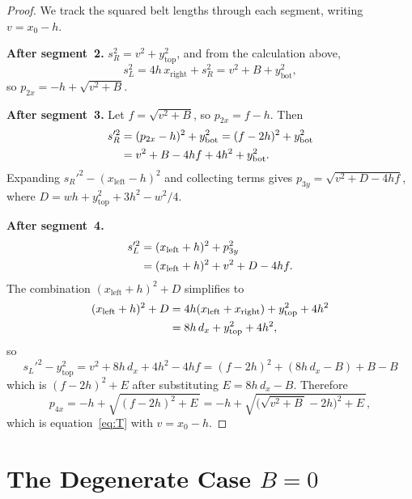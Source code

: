 \documentclass[11pt]{article}
\begin{document}
\begin{proof}
We track the squared belt lengths through each segment,
writing $v = x_0 - h$.

\medskip\noindent
\textbf{After segment~2.}
$s_R^2 = v^2 + y_{\mathrm{top}}^2$, and from the calculation above,
\begin{equation}
  s_L^2 = 4h\,x_{\mathrm{right}} + s_R^2
         = v^2 + B + y_{\mathrm{bot}}^2,
\end{equation}
so $p_{2x} = -h + \sqrt{v^2 + B}$.

\medskip\noindent
\textbf{After segment~3.}
Let $f = \sqrt{v^2 + B}$, so $p_{2x} = f - h$. Then
\begin{align}
  s_R'^2
    &= (p_{2x} - h)^2 + y_{\mathrm{bot}}^2
     = (f - 2h)^2 + y_{\mathrm{bot}}^2 \notag\\
    &= v^2 + B - 4h f + 4h^2 + y_{\mathrm{bot}}^2.
\end{align}
Expanding $s_R'^2 - (x_{\mathrm{left}} - h)^2$ and collecting terms gives
$p_{3y} = \sqrt{v^2 + D - 4hf}$, where
$D = wh + y_{\mathrm{top}}^2 + 3h^2 - w^2/4$.

\medskip\noindent
\textbf{After segment~4.}
\begin{align}
  s_L'^2
    &= (x_{\mathrm{left}} + h)^2 + p_{3y}^2 \notag\\
    &= (x_{\mathrm{left}} + h)^2 + v^2 + D - 4hf.
\end{align}
The combination $(x_{\mathrm{left}} + h)^2 + D$ simplifies to
\begin{align}
  (x_{\mathrm{left}} + h)^2 + D
    &= 4h(x_{\mathrm{left}} + x_{\mathrm{right}}) + y_{\mathrm{top}}^2
       + 4h^2 \notag \\
    &= 8h\,d_x + y_{\mathrm{top}}^2 + 4h^2,
\end{align}
so
\begin{equation}
  s_L'^2 - y_{\mathrm{top}}^2
    = v^2 + 8h\,d_x + 4h^2 - 4hf
    = (f - 2h)^2 + (8h\,d_x - B) + B - B
\end{equation}
which is $(f - 2h)^2 + E$ after substituting $E = 8h\,d_x - B$.
Therefore
\begin{equation}
  p_{4x}
    = -h + \sqrt{(f - 2h)^2 + E\,}
    = -h + \sqrt{\bigl(\sqrt{v^2 + B\,} - 2h\bigr)^2 + E\,},
\end{equation}
which is equation~\eqref{eq:T} with $v = x_0 - h$.
\end{proof}

\section{The Degenerate Case $B = 0$}
\end{document}
